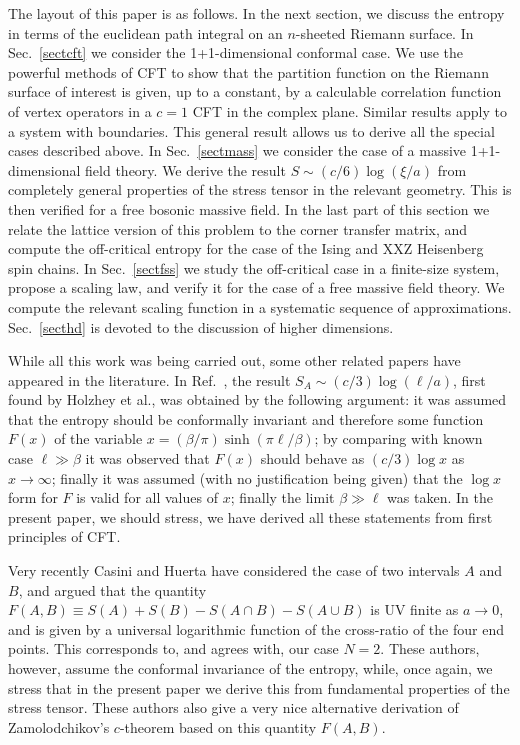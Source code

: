 \documentclass[preprint,aps]{revtex4}
\begin{document}
The layout of this paper is as follows. In the next section, we discuss
the entropy in terms of the euclidean path integral on an $n$-sheeted
Riemann surface. In Sec.~\ref{sectcft} we consider the 1+1-dimensional
conformal case. We use the powerful methods of CFT
to show that the partition function on the Riemann surface of interest
is given, up to a constant, by a calculable correlation function of
vertex operators in a $c=1$ CFT in the complex plane. Similar results
apply to a system with boundaries. This general result allows us to
derive all the special cases described above. In Sec.~\ref{sectmass} we
consider the case of a massive 1+1-dimensional field theory. We derive
the result $S\sim(c/6)\log(\xi/a)$ from completely general properties of
the stress tensor in the relevant geometry. This is then verified for a
free bosonic massive field.
In the last part of this section we relate the
lattice version of this problem to the corner transfer matrix, and
compute the off-critical entropy for the case of the Ising and
XXZ Heisenberg spin chains.
In Sec.~\ref{sectfss} we study the off-critical case in a finite-size
system, propose a scaling law, and verify it for the case of a free
massive field theory. We compute the relevant scaling function in a
systematic sequence of approximations.
Sec.~\ref{secthd} is devoted to the discussion of higher dimensions.

While all this work was being carried out, some other related papers
have appeared in the literature. In Ref.~\cite{Korepin2}, the
result $S_A\sim(c/3)\log(\ell/a)$, first found by Holzhey et
al.\cite{Holzhey},
was obtained by the following argument: it was assumed
that the entropy should be conformally invariant and therefore some
function $F(x)$ of the variable $x=(\beta/\pi)\sinh(\pi\ell/\beta)$;
by comparing with known case $\ell\gg\beta$ \cite{BCN,Affleck} it was
observed that $F(x)$ should behave as $(c/3)\log x$ as $x\to\infty$;
finally it was assumed (with no justification being given) that the
$\log x$ form for $F$ is valid for all values of $x$; finally
the limit $\beta\gg\ell$ was taken. In the present paper, we should
stress, we have derived all these statements from first principles of
CFT.

Very recently Casini and Huerta\cite{Casini} have considered the case
of two intervals $A$ and $B$, and argued that the quantity
$F(A,B)\equiv S(A)+S(B)-S(A\cap B)-S(A\cup B)$ is UV finite as $a\to0$,
and is given by a universal logarithmic function of the cross-ratio
of the four end points. This corresponds to, and agrees with, our case $N=2$.
These authors, however, assume the conformal invariance of the entropy,
while, once again, we stress that in the present paper we derive this from
fundamental
properties of the stress tensor. These authors also give a very nice
alternative derivation of Zamolodchikov's $c$-theorem\cite{Zam} based on
this quantity $F(A,B)$.
\end{document}
